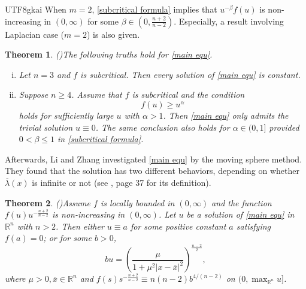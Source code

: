 \documentclass[reqno,12pt]{amsart}
\renewcommand{\bar}{\overline}
\numberwithin{equation}{section}
\newtheorem{thm}{Theorem}[section]
\newcommand{\bR}{{\mathbb R}}  %
\begin{document}
\begin{CJK}{UTF8}{gkai}
		  When $m=2$, \eqref{subcritical formula} implies that $u^{-\beta}f(u)$ is non-increasing in $(0,\infty)$ for some $\beta\in (0,\frac{n+2}{n-2})$. Especially, a result involving Laplacian case ($m=2$) is also given.
		  \begin{thm}{\rm(\hspace{-0.03em}\cite[Theorem 4]{SZ})}\label{thm1.1} The following truths hold for \eqref{main equ}.
		  \begin{enumerate}[(i)]
		  \item Let $n=3$ and $f$ is subcritical. Then every solution of \eqref{main equ} is constant.
		  \item Suppose $n\ge 4$. Assume that $f$ is subcritical and the condition 
		  \begin{equation}\label{superpower}
		  	f(u)\ge u^{\alpha}
		  \end{equation}
		  holds for  sufficiently large $u$ with $\alpha>1$. Then \eqref{main equ} only admits the trivial solution $u\equiv 0$. The same conclusion also holds for $\alpha\in (0,1]$ provided $0<\beta\le 1$ in \eqref{subcritical formula}. 
		  \end{enumerate}
		  \end{thm}
		  
		  Afterwards, Li and Zhang \cite{LZ} investigated \eqref{main equ} by the moving sphere method. They found that the solution has two different behaviors, depending on whether $\bar{\lambda}(x)$ is infinite or not (see \cite{LZ}, page 37 for its definition).
		  \begin{thm}{\rm(\hspace{-0.03em}\cite[Theorem 1.3]{	LZ})}\label{thm 1.3} Assume $f$ is locally bounded in $(0,\infty)$ and the function $f(u)u^{-\frac{n+2}{n-2}}$ is non-increasing in $(0,\infty)$. Let $u$ be a solution of \eqref{main equ} in $\bR^{n}$ with $n>2$. Then either $u\equiv a$ for some positive constant $a$  satisfying $f(a)=0$; or for some $b>0$,
		  \begin{equation*}
		  	bu=\left(\frac{\mu}{1+\mu^{2} |x-\bar{x}|^{2}}\right)^{\frac{n-2}{2}},
		  \end{equation*}
		  where $\mu>0,\bar{x}\in \bR^{n}$ and $f(s)s^{-\frac{n+2}{n-2}}\equiv n(n-2)b^{4/(n-2)}$ on $(0,\max_{\bR^{n}} u]$.
		  \end{thm}
		  

\end{CJK}
\end{document}
